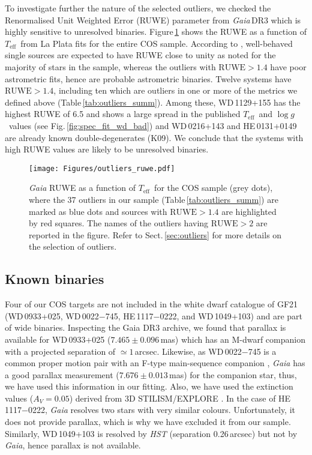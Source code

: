 \documentclass[fleqn,usenatbib, useAMS]{mnras}
\newcommand{\Teff}{\mbox{$T_{\mathrm{eff}}$}}
\newcommand{\logg}{\mbox{$\log g$}}
\begin{document}
To investigate further the nature of the selected outliers, we checked the Renormalised Unit Weighted Error (RUWE) parameter from \textit{Gaia}\,DR3 \citep{2021A&A...649A...2L} which is highly sensitive to unresolved binaries. Figure\,\ref{fig:outl_plot_ruwe} shows the RUWE as a function of \Teff\ from La Plata fits for the entire COS sample. According to \cite{LL:LL-124}, well-behaved single sources are expected to have RUWE close to unity as noted for the majority of stars in the sample, whereas the outliers with $\mathrm{RUWE}>1.4$ have poor astrometric fits, hence are probable astrometric binaries. Twelve systems have $\mathrm{RUWE}>1.4$, including ten which are outliers in one or more of the metrics we defined above (Table\,\ref{tab:outliers_summ}). Among these, WD\,1129+155 has the highest RUWE of 6.5 and shows a large spread in the published \Teff\ and \logg\ values (see Fig.\,\ref{fig:spec_fit_wd_bad}) and WD\,0216+143 and HE\,0131+0149 are already known double-degenerates (K09). We conclude that the systems with high RUWE values are likely to be unresolved binaries.

\begin{figure}
\centering
\texttt{[image: Figures/outliers\_ruwe.pdf]}
\caption{\textit{Gaia} RUWE as a function of \Teff\ for the COS sample (grey dots),  where the 37 outliers in our sample (Table\,\ref{tab:outliers_summ}) are marked as blue dots and sources with $\mathrm{RUWE}>1.4$ are highlighted by red squares. The names of the outliers having $\mathrm{RUWE}>2$ are reported in the figure. Refer to Sect.\,\ref{sec:outliers} for more details on the selection of outliers.}
\label{fig:outl_plot_ruwe}
\end{figure}

\subsection{Known binaries}
Four of our COS targets are not included in the white dwarf catalogue of GF21  (WD\,0933+025, WD\,0022$-$745, HE\,1117$-$0222, and WD\,1049+103) and are part of wide binaries. Inspecting the Gaia DR3 archive, we found that parallax is available for WD\,0933+025 ($7.465\pm0.096$\,mas) which has an M-dwarf companion with a projected separation of $\simeq1$\,arcsec. Likewise, as WD\,0022$-$745 is a common proper motion pair with an F-type main-sequence companion \citep{1997MNRAS.287..381B}, \textit{Gaia} has a good parallax measurement ($7.676\pm0.013$\,mas) for the companion star, thus, we have used this information in our fitting. Also, we have used the extinction values ($A_{V}=0.05$) derived from 3D STILISM/EXPLORE \citep{lallement2019}. In the case of HE\,1117$-$0222, \textit{Gaia} resolves two stars with very similar colours. Unfortunately, it does not provide parallax, which is why we have excluded it from our sample. Similarly, WD\,1049+103 is resolved by \textit{HST} (separation 0.26\,arcsec) but not by \textit{Gaia}, hence parallax is not available. 
\end{document}
